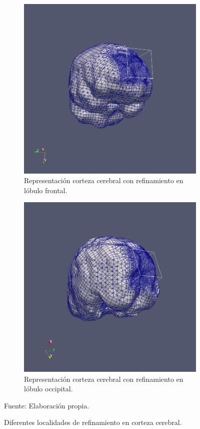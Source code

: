 \begin{figure}[!ht]
    \centering
    \begin{subfigure}[t]{0.45\textwidth}
        \includegraphics[width=1.0\textwidth]{figures/meshes/c_5r7_01.png}
        \caption{Representación corteza cerebral con refinamiento en lóbulo frontal.}
    \end{subfigure}
    \begin{subfigure}[t]{0.45\textwidth}
        \includegraphics[width=1.0\textwidth]{figures/meshes/c_5r7_2_01.png}
        \caption{Representación corteza cerebral con refinamiento en lóbulo occipital.}
    \end{subfigure}
    \caption{ Diferentes localidades de refinamiento en corteza cerebral. }
    Fuente: Elaboración propia.
    \label{fig:c_5r7_all}
\end{figure}


